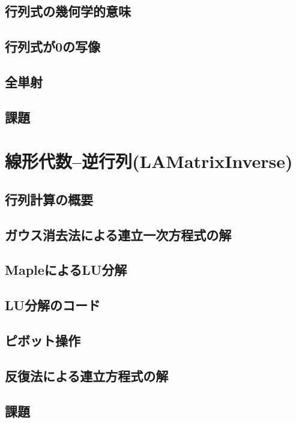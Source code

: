 \documentclass[10pt,a4j]{jsbook}
\begin{document}
\section{行列式の幾何学的意味}
 
\section{行列式が0の写像}
 
\section{全単射}
 
\section{課題}
 


\chapter{線形代数--逆行列(LAMatrixInverse)}
\section{行列計算の概要}
 
\section{ガウス消去法による連立一次方程式の解}
 
\section{MapleによるLU分解}
 
\section{LU分解のコード}
 
\section{ピボット操作}
 
\section{反復法による連立方程式の解}
 
\section{課題}
 
\end{document}
